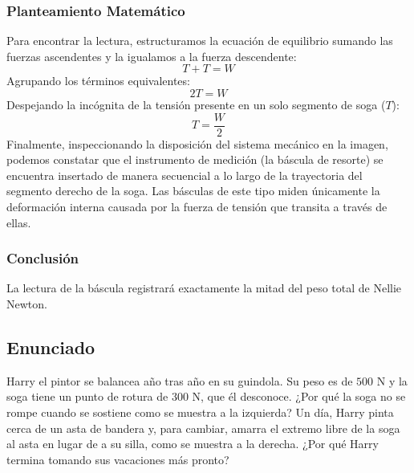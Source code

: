 \documentclass[12pt,letterpaper]{article}
\begin{document}
\subsubsection*{Planteamiento Matemático}
Para encontrar la lectura, estructuramos la ecuación de equilibrio sumando las fuerzas ascendentes y la igualamos a la fuerza descendente:
$$T + T = W$$
Agrupando los términos equivalentes:
$$2T = W$$
Despejando la incógnita de la tensión presente en un solo segmento de soga ($T$):
$$T = \frac{W}{2}$$
Finalmente, inspeccionando la disposición del sistema mecánico en la imagen, podemos constatar que el instrumento de medición (la báscula de resorte) se encuentra insertado de manera secuencial a lo largo de la trayectoria del segmento derecho de la soga. Las básculas de este tipo miden únicamente la deformación interna causada por la fuerza de tensión que transita a través de ellas.

\subsubsection*{Conclusión}
La lectura de la báscula registrará exactamente la mitad del peso total de Nellie Newton.

\newpage

\subsection*{Enunciado}
Harry el pintor se balancea año tras año en su guindola. Su peso es de $500\text{ N}$ y la soga tiene un punto de rotura de $300\text{ N}$, que él desconoce. ¿Por qué la soga no se rompe cuando se sostiene como se muestra a la izquierda? Un día, Harry pinta cerca de un asta de bandera y, para cambiar, amarra el extremo libre de la soga al asta en lugar de a su silla, como se muestra a la derecha. ¿Por qué Harry termina tomando sus vacaciones más pronto?
\end{document}
